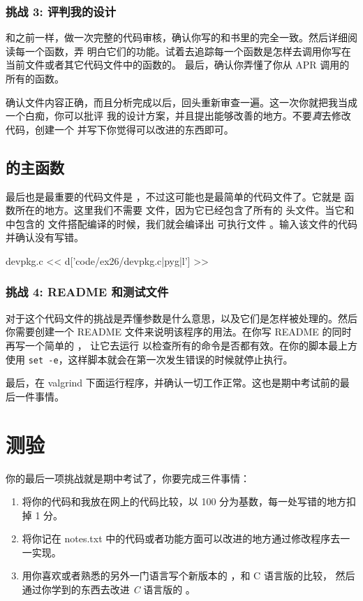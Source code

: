 \subsubsection{挑战 3: 评判我的设计}

和之前一样，做一次完整的代码审核，确认你写的和书里的完全一致。然后详细阅读每一个函数，弄
明白它们的功能。试着去追踪每一个函数是怎样去调用你写在当前文件或者其它代码文件中的函数的。
最后，确认你弄懂了你从 APR 调用的所有的函数。

确认文件内容正确，而且分析完成以后，回头重新审查一遍。这一次你就把我当成一个白痴，你可以批评
我的设计方案，并且提出能够改善的地方。不要\emph{真}去修改代码，创建一个  
并写下你觉得可以改进的东西即可。


\subsection{ 的主函数}

最后也是最重要的代码文件是 ，不过这可能也是最简单的代码文件了。它就是
  函数所在的地方。这里我们不需要  文件，因为它已经包含了所有的
 头文件。当它和  中包含的  文件搭配编译的时候，我们就会编译出
 可执行文件 。输入该文件的代码并确认没有写错。
 

\begin{code}{devpkg.c}
<< d['code/ex26/devpkg.c|pyg|l'] >>
\end{code}

\subsubsection{挑战 4: README 和测试文件}

对于这个代码文件的挑战是弄懂参数是什么意思，以及它们是怎样被处理的。然后你需要创建一个
README 文件来说明该程序的用法。在你写 README 的同时再写一个简单的 ，
让它去运行  以检查所有的命令是否都有效。在你的脚本最上方使用
\verb|set -e|，这样脚本就会在第一次发生错误的时候就停止执行。

最后，在 valgrind 下面运行程序，并确认一切工作正常。这也是期中考试前的最后一件事情。

\section{测验}

你的最后一项挑战就是期中考试了，你要完成三件事情：

\begin{enumerate}
\item 将你的代码和我放在网上的代码比较，以 100 分为基数，每一处写错的地方扣掉 1 分。
\item 将你记在 notes.txt 中的代码或者功能方面可以改进的地方通过修改程序去一一实现。
\item 用你喜欢或者熟悉的另外一门语言写个新版本的 ，和 C 语言版的比较，
    然后通过你学到的东西去改进 \emph{C} 语言版的 。
\end{enumerate}

